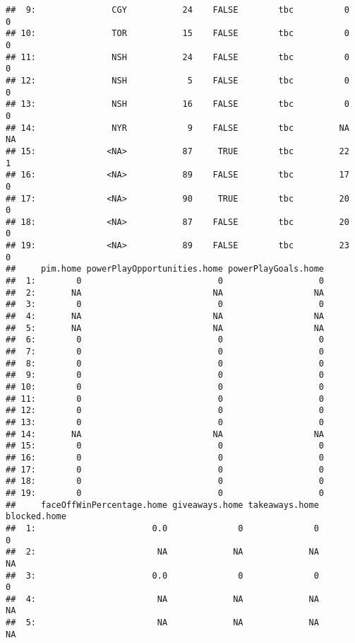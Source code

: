 \documentclass[
]{article}
\begin{document}
\begin{verbatim}
##  9:               CGY           24    FALSE        tbc          0         0
## 10:               TOR           15    FALSE        tbc          0         0
## 11:               NSH           24    FALSE        tbc          0         0
## 12:               NSH            5    FALSE        tbc          0         0
## 13:               NSH           16    FALSE        tbc          0         0
## 14:               NYR            9    FALSE        tbc         NA        NA
## 15:              <NA>           87     TRUE        tbc         22         1
## 16:              <NA>           89    FALSE        tbc         17         0
## 17:              <NA>           90     TRUE        tbc         20         0
## 18:              <NA>           87    FALSE        tbc         20         0
## 19:              <NA>           89    FALSE        tbc         23         0
##     pim.home powerPlayOpportunities.home powerPlayGoals.home
##  1:        0                           0                   0
##  2:       NA                          NA                  NA
##  3:        0                           0                   0
##  4:       NA                          NA                  NA
##  5:       NA                          NA                  NA
##  6:        0                           0                   0
##  7:        0                           0                   0
##  8:        0                           0                   0
##  9:        0                           0                   0
## 10:        0                           0                   0
## 11:        0                           0                   0
## 12:        0                           0                   0
## 13:        0                           0                   0
## 14:       NA                          NA                  NA
## 15:        0                           0                   0
## 16:        0                           0                   0
## 17:        0                           0                   0
## 18:        0                           0                   0
## 19:        0                           0                   0
##     faceOffWinPercentage.home giveaways.home takeaways.home blocked.home
##  1:                       0.0              0              0            0
##  2:                        NA             NA             NA           NA
##  3:                       0.0              0              0            0
##  4:                        NA             NA             NA           NA
##  5:                        NA             NA             NA           NA

\end{verbatim}
\end{document}
